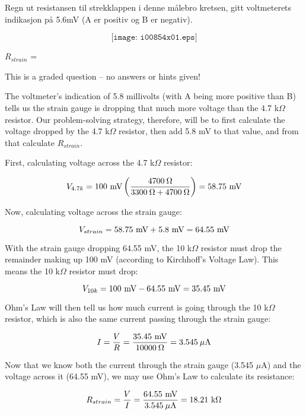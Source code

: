 

Regn ut resistansen til strekklappen i denne målebro kretsen, gitt voltmeterets indikasjon på 5.6mV (A er positiv og B er negativ).

$$\texttt{[image: i00854x01.eps]}$$

$R_{strain}$ = \underbar{\hskip 50pt}

\vfil 

\eject






This is a graded question -- no answers or hints given!







The voltmeter's indication of 5.8 millivolts (with A being more positive than B) tells us the strain gauge is dropping that much more voltage than the 4.7 k$\Omega$ resistor.  Our problem-solving strategy, therefore, will be to first calculate the voltage dropped by the 4.7 k$\Omega$ resistor, then add 5.8 mV to that value, and from that calculate $R_{strain}$.

\vskip 10pt

First, calculating voltage across the 4.7 k$\Omega$ resistor:

$$V_{4.7k} = 100 \hbox{ mV} \left(4700 \> \Omega \over {3300 \> \Omega + 4700 \> \Omega}\right) = 58.75 \hbox{ mV}$$

Now, calculating voltage across the strain gauge:

$$V_{strain} = 58.75 \hbox{ mV} + 5.8 \hbox{ mV} = 64.55 \hbox{ mV}$$

With the strain gauge dropping 64.55 mV, the 10 k$\Omega$ resistor must drop the remainder making up 100 mV (according to Kirchhoff's Voltage Law).  This means the 10 k$\Omega$ resistor must drop:

$$V_{10k} = 100 \hbox{ mV} - 64.55 \hbox{ mV} = 35.45 \hbox{ mV}$$

Ohm's Law will then tell us how much current is going through the 10 k$\Omega$ resistor, which is also the same current passing through the strain gauge:

$$I = {V \over R} = {35.45 \hbox{ mV} \over 10000 \> \Omega} = 3.545 \> \mu\hbox{A}$$

Now that we know both the current through the strain gauge (3.545 $\mu$A) and the voltage across it (64.55 mV), we may use Ohm's Law to calculate its resistance:

$$R_{strain} = {V \over I} = {64.55 \hbox{ mV} \over 3.545 \> \mu\hbox{A}} = 18.21 \hbox{ k}\Omega$$




